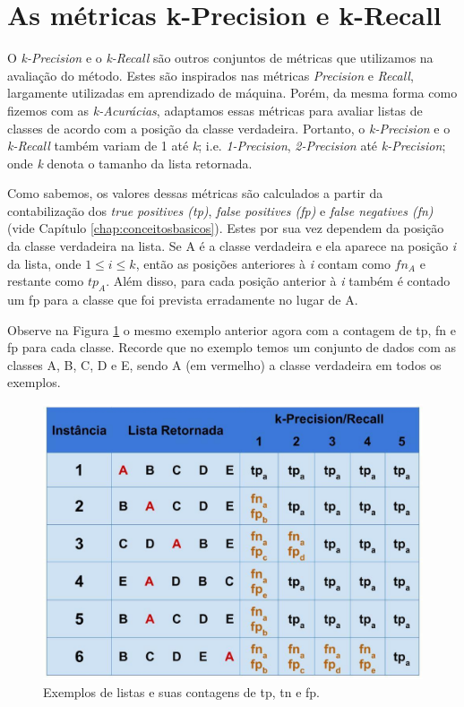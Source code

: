 \section{As métricas k-Precision e k-Recall}

O \textit{k-Precision} e o \textit{k-Recall} são outros conjuntos de métricas que utilizamos na avaliação do método.
Estes são inspirados nas métricas \textit{Precision} e \textit{Recall}, largamente utilizadas em aprendizado de máquina.
Porém, da mesma forma como fizemos com as \textit{k-Acurácias}, adaptamos essas métricas para avaliar listas de classes de acordo com a posição da classe verdadeira.
Portanto, o \textit{k-Precision} e o \textit{k-Recall} também variam de 1 até \textit{k}; i.e. \textit{1-Precision}, \textit{2-Precision} até \textit{k-Precision}; onde \textit{k} denota o tamanho da lista retornada.

Como sabemos, os valores dessas métricas são calculados a partir da contabilização dos \textit{true positives (tp)}, \textit{false positives (fp)} e \textit{false negatives (fn)} (vide Capítulo \ref{chap:conceitosbasicos}).
Estes por sua vez dependem da posição da classe verdadeira na lista.
Se A é a classe verdadeira e ela aparece na posição \textit{i} da lista, onde $1 \leq \textit{i} \leq \textit{k}$, então as posições anteriores à \textit{i} contam como $fn_A$ e restante como $tp_A$.
Além disso, para cada posição anterior à \textit{i} também é contado um fp para a classe que foi prevista erradamente no lugar de A.

Observe na Figura \ref{fig:descricaodostestes02} o mesmo exemplo anterior agora com a contagem de tp, fn e fp para cada classe.
Recorde que no exemplo temos um conjunto de dados com as classes A, B, C, D e E, sendo A (em vermelho) a classe verdadeira em todos os exemplos.

\begin{figure}[h!]
  \centering
  \includegraphics[width=120mm,scale=0.8]{images/descricaodostestes02.eps}
  \caption{Exemplos de listas e suas contagens de tp, tn e fp.}
  \label{fig:descricaodostestes02}
\end{figure}

